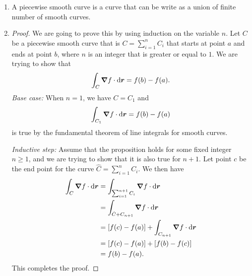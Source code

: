 \documentclass[8pt,twocolumn]{article}
\begin{document}
\begin{Answer}[number=36]
  \begin{enumerate}
    \item A piecewise smooth curve is a curve that can be write as a union of
      finite number of smooth curves.
    \item \begin{proof}
      We are going to prove this by using induction on the variable $n$. Let
      $C$ be a piecewise smooth curve that is $C = \sum_{i=1}^n C_i$ that
      starts at point $a$ and ends at point $b$, where $n$
      is an integer that is greater or equal to $1$. We are trying to show that
      \begin{align*}
        \int_C \grad f \cdot \dd{\bm{r}} = f(b) - f(a).
      \end{align*}
      \emph{Base case:}
      When $n=1$, we have $C = C_1$ and
      \begin{align*}
        \int_{C_1} \grad f \cdot \dd{\bm{r}} = f(b) - f(a)
      \end{align*}
      is true by the fundamental theorem of line integrals for smooth curves.

      \emph{Inductive step:}
      Assume that the proposition holds for some fixed integer $n\ge 1$, and we
      are trying to show that it is also true for $n+1$. Let point $c$ be the
      end point for the curve $\hat{C} = \sum_{i=1}^n C_i$. We then have
      \begin{align*}
        \int_{C}\grad f \cdot \dd{\bm{r}} &= \int_{\sum_{i=1}^{n+1} C_i} \grad
        f \cdot \dd{\bm{r}} \\
        &= \int_{\hat{C} + C_{n+1}} \grad f \cdot \dd{\bm{r}} \\
        &= [f(c) - f(a)] + \int_{C_{n+1}} \grad f \cdot \dd{\bm{r}} \\
        &= [f(c) - f(a)] + [f(b) - f(c)] \\
        &= f(b) - f(a).
      \end{align*}
      This completes the proof.
    \end{proof}
  \end{enumerate}
\end{Answer}
\end{document}

